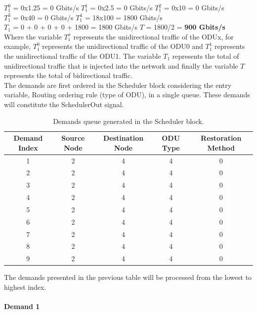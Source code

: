 $T_1^0$ = 0x1.25 = 0 Gbits/s \qquad
$T_1^1$ = 0x2.5 = 0 Gbits/s \qquad
$T_1^2$ = 0x10 = 0 Gbits/s \\

$T_1^3$ = 0x40 = 0 Gbits/s \quad
$T_1^4$ = 18x100 = 1800 Gbits/s \\

$T_{1}$ = 0 + 0 + 0 + 0 + 1800 = 1800 Gbits/s \qquad
$T$ = 1800/2 = \textbf{900 Gbits/s}\\

Where the variable $T_1^x$ represents the unidirectional traffic of the ODUx, for example, $T_1^0$ represents the unidirectional traffic of the ODU0 and $T_1^1$ represents the unidirectional traffic of the ODU1. The variable $T_{1}$ represents the total of unidirectional traffic that is injected into the network and finally the variable $T$ represents the total of bidirectional traffic.\\

The demands are first ordered in the Scheduler block considering the entry variable, Routing ordering rule (type of ODU), in a single queue. These demands will constitute the SchedulerOut signal.

\begin{table}[H]
	\centering
	\begin{tabular}{| c | c | c | c | c |}
		
		\hline
		 Demand Index  & Source Node & Destination Node & ODU Type & Restoration Method \\
		\hline
		
		1 & 2 & 4 & 4 & 0\\ \hline
		2 & 2 & 4 & 4 & 0\\ \hline
		3 & 2 & 4 & 4 & 0\\ \hline
		4 & 2 & 4 & 4 & 0\\ \hline
		5 & 2 & 4 & 4 & 0\\ \hline
		6 & 2 & 4 & 4 & 0\\ \hline
		7 & 2 & 4 & 4 & 0\\ \hline
		8 & 2 & 4 & 4 & 0\\ \hline
		9 & 2 & 4 & 4 & 0\\ \hline

	\end{tabular}
	\caption{Demands queue generated in the Scheduler block.}
	\label{scheduler_example}
\end{table}

The demands presented in the previous table will be processed from the lowest to highest index.
\\ \\
\textbf{Demand 1}\\ \\

